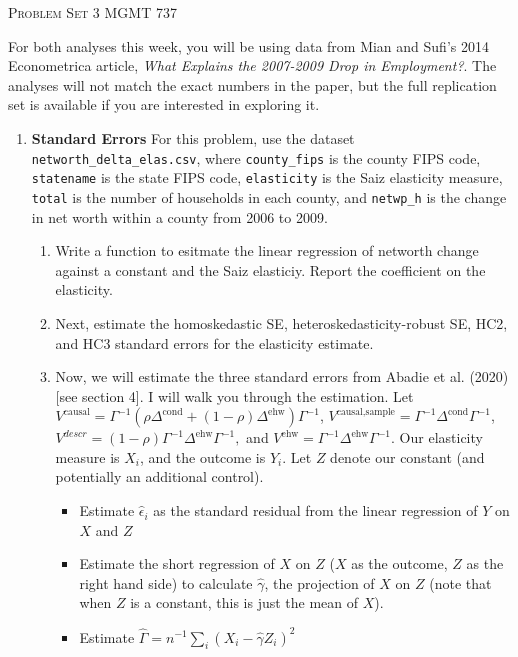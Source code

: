 \documentclass[11pt, a4paper]{article}
\begin{document}
\begin{center}
  {\Large \textsc{Problem Set 3}}
  MGMT 737
\end{center}

For both analyses this week, you will be using data from Mian and
Sufi's 2014 Econometrica article, \textit{What Explains the 2007-2009
  Drop in Employment?}. The analyses will not match the exact
numbers in the paper, but the full replication set is available if you are interested in exploring it.

\begin{enumerate}
\item \textbf{Standard Errors} For this problem, use the dataset \texttt{networth\_delta\_elas.csv}, where \texttt{county\_fips} is the county FIPS code, \texttt{statename} is the state FIPS code, \texttt{elasticity} is the Saiz elasticity measure, \texttt{total} is the number of households in each county, and \texttt{netwp\_h} is the change in net worth within a county from 2006 to 2009.
  \begin{enumerate}
  \item Write a function to esitmate the linear regression of networth change against a constant and the Saiz elasticiy. Report the coefficient on the elasticity. 
  \item Next, estimate the homoskedastic SE, heteroskedasticity-robust SE, HC2, and HC3 standard errors for the elasticity estimate.
  \item Now, we will estimate the three standard errors from Abadie et al. (2020) [see section 4]. I will walk you through the estimation. Let $V^{\text{causal}} = \Gamma^{-1}(\rho\Delta^{\text{cond}} + (1-\rho)\Delta^{\text{ehw}})\Gamma^{-1}$, $V^{\text{causal,sample}} = \Gamma^{-1}\Delta^{\text{cond}}\Gamma^{-1}$, $V^{descr} = (1-\rho)\Gamma^{-1}\Delta^{\text{ehw}}\Gamma^{-1},$ and $V^{\text{ehw}} = \Gamma^{-1}\Delta^{\text{ehw}}\Gamma^{-1}.$ Our elasticity measure is $X_{i}$, and the outcome is $Y_{i}$. Let $Z$ denote our constant (and potentially an additional control).
    \begin{itemize}
    \item Estimate $\hat{\epsilon}_{i}$ as the standard residual from
      the linear regression of $Y$ on $X$ and $Z$
    \item Estimate the short regression of $X$ on $Z$ ($X$ as the outcome, $Z$ as the right hand side)  to calculate $\hat{\gamma}$, the projection of $X$ on $Z$ (note that when $Z$ is a constant, this is just the mean of $X$).
    \item Estimate $\hat{\Gamma} = n^{-1}\sum_{i}(X_{i} - \hat{\gamma}Z_{i})^{2}$

\end{itemize}
\end{enumerate}
\end{enumerate}
\end{document}
